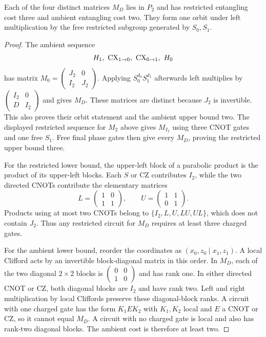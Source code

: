 \begin{theorem}\label{g:thm:clifford-two-analytic}
Each of the four distinct matrices $M_D$ lies in $P_2$ and has restricted entangling cost three and ambient entangling cost two.  They form one orbit under left multiplication by the free restricted subgroup generated by $S_0,S_1$.
\end{theorem}
\begin{proof}
The ambient sequence
\[
H_1,\ \operatorname{CX}_{1\to0},\ \operatorname{CX}_{0\to1},\ H_0
\]
has matrix $M_0=\left(\begin{smallmatrix}J_2&0\\I_2&J_2\end{smallmatrix}\right)$.  Applying $S_0^{d_0}S_1^{d_1}$ afterwards left multiplies by $\left(\begin{smallmatrix}I_2&0\\D&I_2\end{smallmatrix}\right)$ and gives $M_D$.  These matrices are distinct because $J_2$ is invertible.  This also proves their orbit statement and the ambient upper bound two.  The displayed restricted sequence for $M_2$ above gives $M_{I_2}$ using three CNOT gates and one free $S_1$.  Free final phase gates then give every $M_D$, proving the restricted upper bound three.

For the restricted lower bound, the upper-left block of a parabolic product is the product of its upper-left blocks.  Each $S$ or CZ contributes $I_2$, while the two directed CNOTs contribute the elementary matrices
\[
L=\begin{pmatrix}1&0\\1&1\end{pmatrix},
\qquad U=\begin{pmatrix}1&1\\0&1\end{pmatrix}.
\]
Products using at most two CNOTs belong to $\{I_2,L,U,LU,UL\}$, which does not contain $J_2$.  Thus any restricted circuit for $M_D$ requires at least three charged gates.

For the ambient lower bound, reorder the coordinates as $(x_0,z_0\mid x_1,z_1)$.  A local Clifford acts by an invertible block-diagonal matrix in this order.  In $M_D$, each of the two diagonal $2\times2$ blocks is $\left(\begin{smallmatrix}0&0\\1&0\end{smallmatrix}\right)$ and has rank one.  In either directed CNOT or CZ, both diagonal blocks are $I_2$ and have rank two.  Left and right multiplication by local Cliffords preserve these diagonal-block ranks.  A circuit with one charged gate has the form $K_1 E K_2$ with $K_1,K_2$ local and $E$ a CNOT or CZ, so it cannot equal $M_D$.  A circuit with no charged gate is local and also has rank-two diagonal blocks.  The ambient cost is therefore at least two.
\end{proof}


